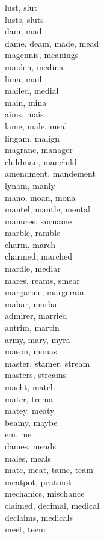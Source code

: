 lust, slut\\
lusts, sluts\\
dam, mad\\
dame, deam, made, mead\\
magennis, meanings\\
maiden, medina\\
lima, mail\\
mailed, medial\\
main, mina\\
aims, mais\\
lame, male, meal\\
lingam, malign\\
magrane, manager\\
childman, manchild\\
amendment, mandement\\
lynam, manly\\
mano, moan, mona\\
mantel, mantle, mental\\
manures, surname\\
marble, ramble\\
charm, march\\
charmed, marched\\
mardle, medlar\\
mares, reams, smear\\
margarine, margerain\\
mahar, marha\\
admirer, married\\
antrim, martin\\
army, mary, myra\\
mason, monas\\
master, stamer, stream\\
masters, streams\\
macht, match\\
mater, trema\\
matey, meaty\\
beamy, maybe\\
em, me\\
dames, meads\\
males, meals\\
mate, meat, tame, team\\
meatpot, peatmot\\
mechanics, mischance\\
claimed, decimal, medical\\
declaims, medicals\\
meet, teem\\

